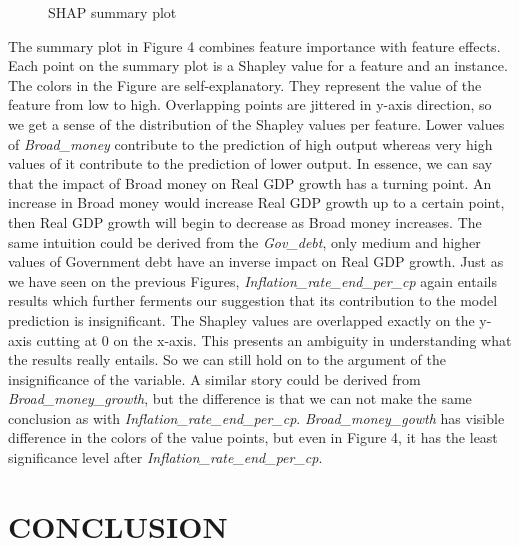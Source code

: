 \documentclass[12pt,italian, twoside]{report}
\begin{document}
\begin{enumerate}
\begin{figure}[t]
		\caption{SHAP summary plot}
		\label{fig: summary}
	\end{figure}
	 The summary plot in Figure 4 combines feature importance with feature effects. Each point on the summary plot is a Shapley value for a feature and an instance. The colors in the Figure are self-explanatory. They represent the value of the feature from low to high. Overlapping points are jittered in y-axis direction, so we get a sense of the distribution of the Shapley values per feature. Lower values of \textit{Broad\_money} contribute to the prediction of high output whereas very high values of it contribute to the prediction of lower output. In essence, we can say that the impact of Broad money on Real GDP growth has a turning point. An increase in Broad money would increase Real GDP growth up to a certain point, then Real GDP growth will begin to decrease as Broad money increases. The same intuition could be derived from the \textit{Gov\_debt}, only medium and higher values of Government debt have an inverse impact on Real GDP growth. Just as we have seen on the previous Figures, \textit{Inflation\_rate\_end\_per\_cp} again entails results which further ferments our suggestion that its contribution to the model prediction is insignificant. The Shapley values are overlapped exactly on the y-axis cutting at 0 on the x-axis. This presents an ambiguity in understanding what the results really entails. So we can still hold on to the argument of the insignificance of the variable. A similar story could be derived from \textit{Broad\_money\_growth}, but the difference is that we can not make the same conclusion as with \textit{Inflation\_rate\_end\_per\_cp}.  \textit{Broad\_money\_gowth} has visible difference in the colors of the value points, but even in Figure 4, it has the least significance level after \textit{Inflation\_rate\_end\_per\_cp}. 
	\end{enumerate}
		
% 
% 

\chapter{CONCLUSION}
\label{cap6}
\end{document}
